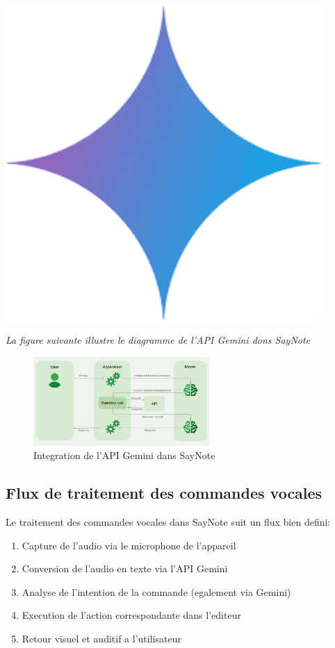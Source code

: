 \begin{minipage}{0.25\textwidth}
\centering
\includegraphics[width=0.9\textwidth]{assets/docs/gemini.png}
\end{minipage}

\noindent
\textit{La figure suivante illustre le diagramme de l'API Gemini dons SayNote}
\begin{figure}[H]
\centering
\includegraphics[width=0.6\textwidth]{assets/docs/golobal-diagrams/gemini-api-diagram.png}
\caption{Integration de l'API Gemini dans SayNote}
\label{fig:gemini-api}
\end{figure}

\subsection{Flux de traitement des commandes vocales}
Le traitement des commandes vocales dans SayNote suit un flux bien defini:
\begin{enumerate}
    \item Capture de l'audio via le microphone de l'appareil
    \item Conversion de l'audio en texte via l'API Gemini
    \item Analyse de l'intention de la commande (egalement via Gemini)
    \item Execution de l'action correspondante dans l'editeur
    \item Retour visuel et auditif a l'utilisateur
\end{enumerate}

